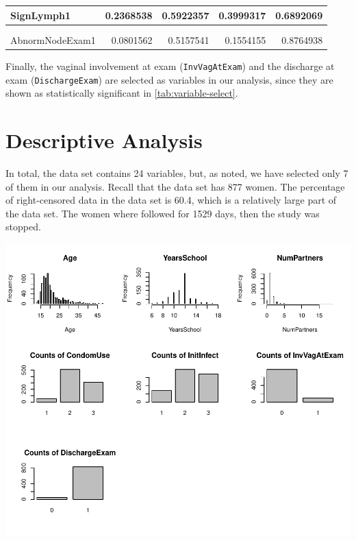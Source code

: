 \documentclass[
]{article}
\begin{document}
\begin{tabular}{l|r|r|r|r}
\hline
SignLymph1 & 0.2368538 & 0.5922357 & 0.3999317 & 0.6892069\\
\hline
\cellcolor{blue}{\textcolor{white}{InvVagAtExam1}} & \cellcolor{blue}{\textcolor{white}{0.5726933}} & \cellcolor{blue}{\textcolor{white}{0.2003764}} & \cellcolor{blue}{\textcolor{white}{2.8580874}} & \cellcolor{blue}{\textcolor{white}{0.0042620}}\\
\hline
\cellcolor{blue}{\textcolor{white}{DischargeExam1}} & \cellcolor{blue}{\textcolor{white}{-0.5805191}} & \cellcolor{blue}{\textcolor{white}{0.2691414}} & \cellcolor{blue}{\textcolor{white}{-2.1569301}} & \cellcolor{blue}{\textcolor{white}{0.0310111}}\\
\hline
AbnormNodeExam1 & 0.0801562 & 0.5157541 & 0.1554155 & 0.8764938\\
\hline
\end{tabular}

Finally, the vaginal involvement at exam (\texttt{InvVagAtExam}) and the discharge at exam (\texttt{DischargeExam}) are selected as variables in our analysis, since they are shown as statistically significant in \ref{tab:variable-select}.

\hypertarget{descriptive-analysis}{%
\section{Descriptive Analysis}\label{descriptive-analysis}}

In total, the data set contains 24 variables, but, as noted, we have selected only 7 of them in our analysis. Recall that the data set has 877 women. The percentage of right-censored data in the data set is 60.4, which is a relatively large part of the data set. The women where followed for 1529 days, then the study was stopped.

\includegraphics{practical_files/figure-latex/EDA-plots-1.pdf}
\end{document}
